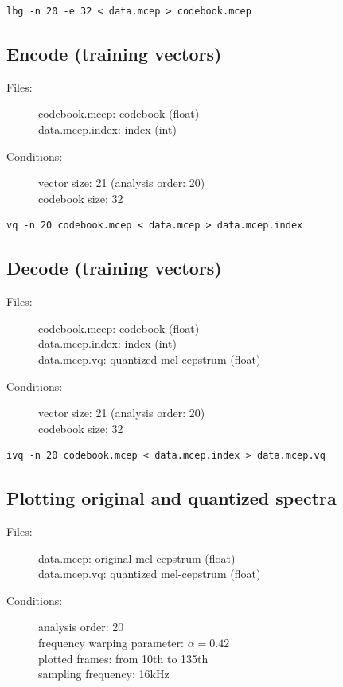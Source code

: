 \documentclass[a4paper]{article}
\begin{document}
\begin{verbatim}
lbg -n 20 -e 32 < data.mcep > codebook.mcep
\end{verbatim}

\subsection{Encode (training vectors)}

\begin{description}
\item[Files:]
   codebook.mcep: codebook (float)\\
   data.mcep.index: index (int)
\item[Conditions:]
   vector size: 21 (analysis order: 20)\\
   codebook size: 32
\end{description}

\begin{verbatim}
vq -n 20 codebook.mcep < data.mcep > data.mcep.index
\end{verbatim}

\subsection{Decode (training vectors)}

\begin{description}
\item[Files:]
   codebook.mcep: codebook (float)\\
   data.mcep.index: index (int)\\
   data.mcep.vq: quantized mel-cepstrum (float)
\item[Conditions:]
   vector size: 21 (analysis order: 20)\\
   codebook size: 32
\end{description}

\begin{verbatim}
ivq -n 20 codebook.mcep < data.mcep.index > data.mcep.vq
\end{verbatim}

\subsection{Plotting original and quantized spectra}

\begin{description}
\item[Files:]
  data.mcep: original mel-cepstrum (float)\\
  data.mcep.vq: quantized mel-cepstrum (float)
\item[Conditions:]
  analysis order: 20\\
  frequency warping parameter: $\alpha = 0.42$\\
  plotted frames: from 10th to 135th\\
  sampling frequency: 16kHz
\end{description}
\end{document}
